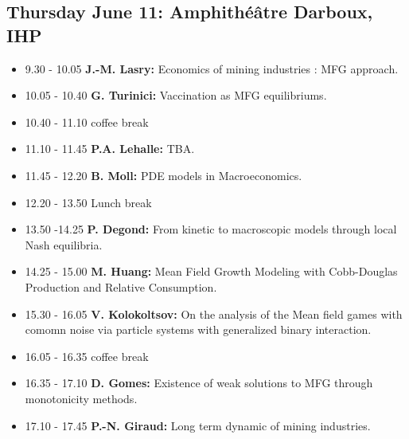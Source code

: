 \documentclass[11pt]{article}
\begin{document}
\subsection*{Thursday June  11: Amphith{\'e}{\^a}tre Darboux, IHP}
\begin{itemize}
\item 9.30 - 10.05 {\bf J.-M. Lasry:} Economics of mining industries : MFG approach.\item
10.05 - 10.40  {\bf  G. Turinici:} Vaccination as MFG equilibriums.\item
10.40 - 11.10   coffee break\item
11.10 - 11.45 {\bf  P.A. Lehalle:}  TBA.\item
11.45 - 12.20 {\bf  B. Moll:}  PDE models in Macroeconomics. \item
12.20 - 13.50  Lunch break\item
13.50 -14.25 {\bf  P. Degond:} From kinetic to macroscopic models through local Nash equilibria. \item
14.25 - 15.00 {\bf M. Huang:} Mean Field Growth Modeling with Cobb-Douglas Production and Relative Consumption.\item
15.30 - 16.05  {\bf  V. Kolokoltsov:} On the analysis of the Mean field games with comomn noise via particle systems with generalized binary interaction. \item
16.05 - 16.35  coffee break \item
16.35 - 17.10 {\bf   D. Gomes:} Existence of weak solutions to MFG through monotonicity methods.\item
17.10 - 17.45 {\bf   P.-N. Giraud:} Long term dynamic of mining industries. 
\end{itemize}

 \vfill
\eject
\end{document}
